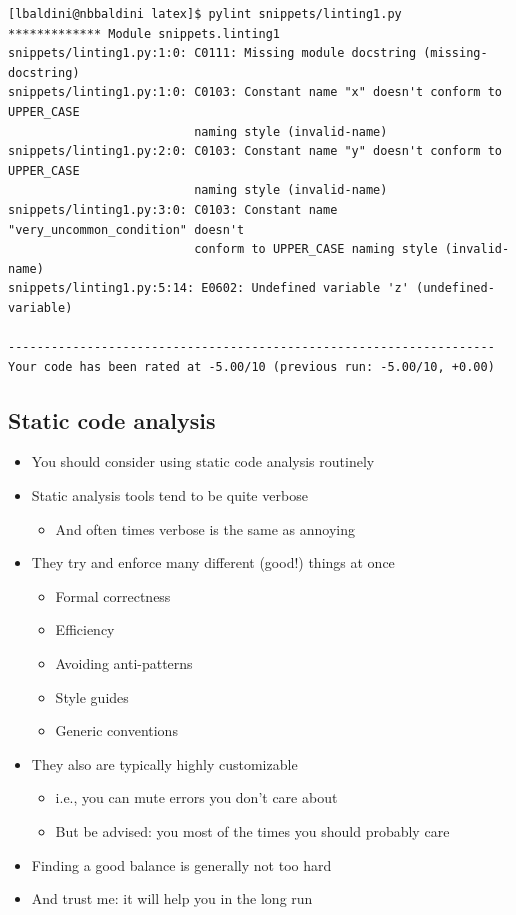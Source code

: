   {\scriptsize
    \begin{Verbatim}
[lbaldini@nbbaldini latex]$ pylint snippets/linting1.py 
************* Module snippets.linting1
snippets/linting1.py:1:0: C0111: Missing module docstring (missing-docstring)
snippets/linting1.py:1:0: C0103: Constant name "x" doesn't conform to UPPER_CASE
                          naming style (invalid-name)
snippets/linting1.py:2:0: C0103: Constant name "y" doesn't conform to UPPER_CASE
                          naming style (invalid-name)
snippets/linting1.py:3:0: C0103: Constant name "very_uncommon_condition" doesn't
                          conform to UPPER_CASE naming style (invalid-name)
snippets/linting1.py:5:14: E0602: Undefined variable 'z' (undefined-variable)

--------------------------------------------------------------------
Your code has been rated at -5.00/10 (previous run: -5.00/10, +0.00)
    \end{Verbatim}
  }
  
\subsection{Static code analysis}  

  \begin{itemize}
  \item \alert{You should consider using static code analysis routinely}
  \item Static analysis tools tend to be quite verbose
    \begin{itemize}
    \item And often times verbose is the same as annoying
    \end{itemize}
  \item They try and enforce many different (good!) things at once
    \begin{itemize}
    \item Formal correctness
    \item Efficiency
    \item Avoiding anti-patterns
    \item Style guides
    \item Generic conventions
    \end{itemize}
  \item They also are typically highly customizable
    \begin{itemize}
    \item i.e., you can mute errors you don't care about
    \item But be advised: you most of the times you should probably care
    \end{itemize}
  \item \alert{Finding a good balance is generally not too hard}
  \item And trust me: it will help you in the long run
  \end{itemize}

